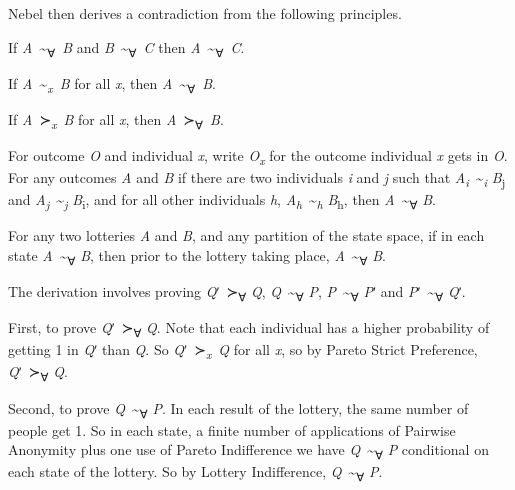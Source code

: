 \documentclass[
  11pt,
  letterpaper,
  DIV=11,
  numbers=noendperiod,
  twoside]{scrartcl}
\providecommand{\tightlist}{%
  \setlength{\itemsep}{0pt}\setlength{\parskip}{0pt}}
\begin{document}
Nebel then derives a contradiction from the following principles.

\begin{description}
\tightlist
\item[Transitivity of Social Indifference]
If \emph{A}~\textasciitilde{}\textsubscript{∀}~\emph{B} and
\emph{B}~\textasciitilde{}\textsubscript{∀}~\emph{C} then
\emph{A}~\textasciitilde{}\textsubscript{∀}~\emph{C}.
\item[Pareto Indifference]
If \emph{A}~\textasciitilde{}\textsubscript{\emph{x}}~\emph{B} for all
\emph{x}, then \emph{A}~\textasciitilde{}\textsubscript{∀}~\emph{B}.
\item[Pareto Strict Preference]
If \emph{A}~≻\textsubscript{\emph{x}}~\emph{B} for all \emph{x}, then
\emph{A}~≻\textsubscript{∀}~\emph{B}.
\item[Pairwise Anonymity]
For outcome \emph{O} and individual \emph{x}, write
\emph{O\textsubscript{x}} for the outcome individual \emph{x} gets in
\emph{O}. For any outcomes \emph{A} and \emph{B} if there are two
individuals \emph{i} and \emph{j} such that
\emph{A\textsubscript{i}}~\textasciitilde{}\textsubscript{\emph{i}}
\emph{B}\textsubscript{j} and
\emph{A\textsubscript{j}}~\textasciitilde{}\textsubscript{\emph{j}}
\emph{B}\textsubscript{i}, and for all other individuals \emph{h},
\emph{A\textsubscript{h}}~\textasciitilde{}\textsubscript{\emph{h}}
\emph{B}\textsubscript{h}, then
\emph{A}~\textasciitilde{}\textsubscript{∀} \emph{B}.
\item[State Indifference]
For any two lotteries \emph{A} and \emph{B}, and any partition of the
state space, if in each state
\emph{A}~\textasciitilde{}\textsubscript{∀} \emph{B}, then prior to the
lottery taking place, \emph{A}~\textasciitilde{}\textsubscript{∀}
\emph{B}.
\end{description}

The derivation involves proving \emph{Q}ʹ~≻\textsubscript{∀} \emph{Q},
\emph{Q}~\textasciitilde{}\textsubscript{∀} \emph{P},
\emph{P}~\textasciitilde{}\textsubscript{∀} \emph{P}ʹ and
\emph{P}ʹ~\textasciitilde{}\textsubscript{∀} \emph{Q}ʹ.

First, to prove \emph{Q}ʹ~≻\textsubscript{∀} \emph{Q}. Note that each
individual has a higher probability of getting 1 in \emph{Q}ʹ than
\emph{Q}. So \emph{Q}ʹ~≻\textsubscript{\emph{x}}~\emph{Q} for all
\emph{x}, so by Pareto Strict Preference, \emph{Q}ʹ~≻\textsubscript{∀}
\emph{Q}.

Second, to prove \emph{Q}~\textasciitilde{}\textsubscript{∀} \emph{P}.
In each result of the lottery, the same number of people get 1. So in
each state, a finite number of applications of Pairwise Anonymity plus
one use of Pareto Indifference we have
\emph{Q}~\textasciitilde{}\textsubscript{∀} \emph{P} conditional on each
state of the lottery. So by Lottery Indifference,
\emph{Q}~\textasciitilde{}\textsubscript{∀} \emph{P}.
\end{document}
